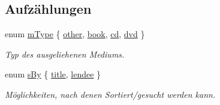 \subsection*{Aufzählungen}
\begin{DoxyCompactItemize}
\item 
enum \hyperlink{group___lend_lib_item_ga636cfca014f3212ea82d45e28f9cb51b}{m\+Type} \{ \hyperlink{group___lend_lib_item_gga636cfca014f3212ea82d45e28f9cb51ba7e338ad381a84ef6df07e7d425707025}{other}, 
\hyperlink{group___lend_lib_item_gga636cfca014f3212ea82d45e28f9cb51ba6053cbf2a0d801307c80aec065560db6}{book}, 
\hyperlink{group___lend_lib_item_gga636cfca014f3212ea82d45e28f9cb51bae7dab93ee81e7f74327bed188e6f3748}{cd}, 
\hyperlink{group___lend_lib_item_gga636cfca014f3212ea82d45e28f9cb51ba9250e48899d18438f51e7df957e35ea5}{dvd}
 \}\begin{DoxyCompactList}\small\item\em Typ des ausgeliehenen Mediums. \end{DoxyCompactList}
\item 
enum \hyperlink{group___lend_lib_item_ga557119015745f6890b5eb4367beba8f3}{s\+By} \{ \hyperlink{group___lend_lib_item_gga557119015745f6890b5eb4367beba8f3ae9eadc6828eb5edd3ed076e4f07a551b}{title}, 
\hyperlink{group___lend_lib_item_gga557119015745f6890b5eb4367beba8f3af2cee0a493fa3e44b3dca715f7202db9}{lendee}
 \}\begin{DoxyCompactList}\small\item\em Möglichkeiten, nach denen Sortiert/gesucht werden kann. \end{DoxyCompactList}
\end{DoxyCompactItemize}
